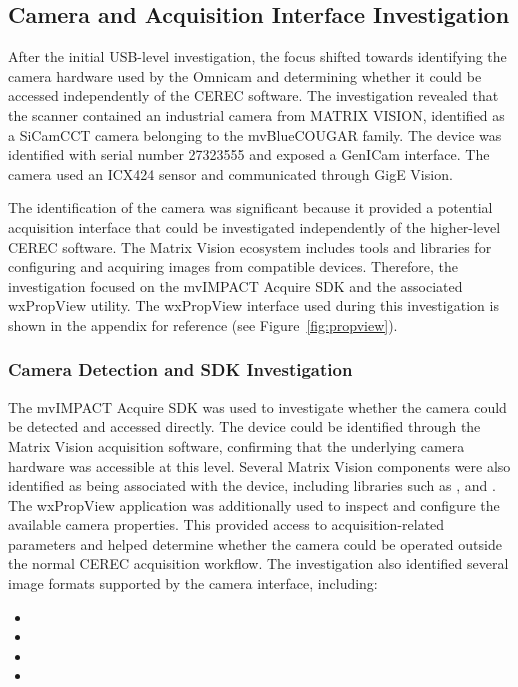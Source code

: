 \subsection{Camera and Acquisition Interface Investigation}

After the initial USB-level investigation, the focus shifted towards identifying the camera hardware used by the Omnicam and determining whether it could be accessed independently of the CEREC software. The investigation revealed that the scanner contained an industrial camera from MATRIX VISION, identified as a SiCamCCT camera belonging to the mvBlueCOUGAR family. The device was identified with serial number 27323555 and exposed a GenICam interface. The camera used an ICX424 sensor and communicated through GigE Vision.

The identification of the camera was significant because it provided a potential acquisition interface that could be investigated independently of the higher-level CEREC software. The Matrix Vision ecosystem includes tools and libraries for configuring and acquiring images from compatible devices. Therefore, the investigation focused on the mvIMPACT Acquire SDK and the associated wxPropView utility. The wxPropView interface used during this investigation is shown in the appendix for reference (see Figure~\ref{fig:propview}). 

\subsubsection{Camera Detection and SDK Investigation}

The mvIMPACT Acquire SDK was used to investigate whether the camera could be detected and accessed directly. The device could be identified through the Matrix Vision acquisition software, confirming that the underlying camera hardware was accessible at this level. Several Matrix Vision components were also identified as being associated with the device, including libraries such as ,  and . The wxPropView application was additionally used to inspect and configure the available camera properties. This provided access to acquisition-related parameters and helped determine whether the camera could be operated outside the normal CEREC acquisition workflow. The investigation also identified several image formats supported by the camera interface, including:

\begin{itemize}
    \item {}
    \item {}
    \item {}
    \item {}
\end{itemize}

